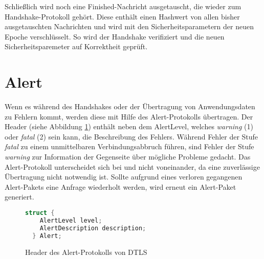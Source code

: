 Schließlich wird noch eine Finished-Nachricht ausgetauscht, die wieder zum Handshake-Protokoll gehört. Diese enthält einen Hashwert von allen bisher ausgetauschten
Nachrichten und wird mit den Sicherheitsparametern der neuen Epoche verschlüsselt. So wird der Handshake verifiziert und die neuen Sicherheitsparemeter auf Korrektheit
geprüft.


\section{Alert}

Wenn es während des Handshakes oder der Übertragung von Anwendungsdaten zu Fehlern kommt, werden diese mit Hilfe des Alert-Protokolls übertragen.
Der Header (siehe Abbildung \ref{fig:alertlayer}) enthält neben dem AlertLevel, welches \textit{warning} (1) oder \textit{fatal} (2) sein kann,
die Beschreibung des Fehlers. Während Fehler der Stufe \textit{fatal} zu einem unmittelbaren Verbindungsabbruch führen, sind Fehler der Stufe
\textit{warning} zur Information der Gegenseite über mögliche Probleme gedacht. Das Alert-Protokoll unterscheidet sich bei  und 
nicht voneinander, da eine zuverlässige Übertragung nicht notwendig ist. Sollte aufgrund eines verloren gegangenen Alert-Pakets eine Anfrage
wiederholt werden, wird erneut ein Alert-Paket generiert. 

\begin{figure}[ht]
  \centering
  \begin{lstlisting}[language=c]
  struct {
    AlertLevel level;
    AlertDescription description;
  } Alert;
  \end{lstlisting}
  \caption{Header des Alert-Protokolls von DTLS}
  \label{fig:alertlayer}
\end{figure}